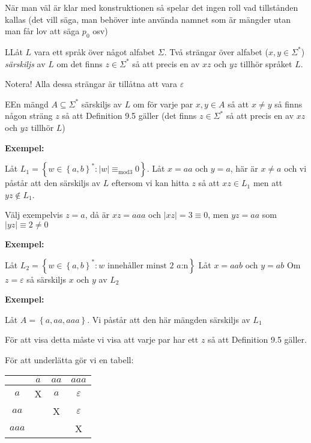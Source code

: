 \par\bigskip
\noindent När man väl är klar med konstruktionen så spelar det ingen roll vad tillstånden kallas (det vill säga, man behöver inte använda namnet som är mängder utan man får lov att säga $p_0$ osv)
\par\bigskip
\begin{theo}
  LLåt $L$ vara ett språk över något alfabet $\Sigma$. Två strängar över alfabet ($x,y\in\Sigma^*$) \textit{särskiljs} av $L$ om det finns $z\in\Sigma^*$ så att precis en av $xz$ och $yz$ tillhör språket $L$.
  \par\bigskip
  \noindent Notera! Alla dessa strängar är tillåtna att vara $\varepsilon$
\end{theo}
\par\bigskip
\begin{theo}
  EEn mängd $A\subseteq\Sigma^*$ särskiljs av $L$ om för varje par $x,y\in A$ så att $x\neq y$ så finns någon sträng $z$ så att Definition 9.5 gäller (det finns $z\in\Sigma^*$ så att precis en av $xz$ och $yz$ tillhör $L$)
\end{theo}
\par\bigskip
\noindent\textbf{Exempel:}\par
\noindent Låt $L_1 = \left\{w\in\left\{a,b\right\}^*:\left|w\right|\equiv_{\text{mod}3} 0\right\}$. Låt $x=aa$ och $y=a$, här är $x\neq a$ och vi påstår att den särskiljs av $L$ eftersom vi kan hitta $z$ så att $xz\in L_1$ men att $yz\notin L_1$.\par
\noindent Välj exempelvis $z=a$, då är $xz=aaa$ och $\left|xz\right|=3\equiv0$, men $yz=aa$ som $\left|yz\right|\equiv2\neq0$
\par\bigskip
\noindent\textbf{Exempel:}\par
\noindent Låt $L_2 = \left\{w\in\left\{a,b\right\}^*: w\text{ innehåller minst 2 } a\text{:n}\right\}$ Låt $x=aab$ och  $y=ab$
\noindent Om $z=\varepsilon$ så särskiljs $x$ och $y$ av $L_2$
\par\bigskip
\noindent\textbf{Exempel:}\par
\noindent Låt $A=\left\{a,aa,aaa\right\}$. Vi påstår att den här mängden särskiljs av $L_1$\par
\noindent För att visa detta måste vi visa att varje par har ett $z$ så att Definition 9.5 gäller.\par
\noindent För att underlätta gör vi en tabell:
\par\bigskip
\begin{center}
  \begin{tabular}{c|c|c|c}
    &$a$&$aa$&$aaa$\\
    \hline
    $a$&X&$a$&$\varepsilon$\\
    $aa$&&X&$\varepsilon$\\
    $aaa$&&&X
  \end{tabular}
\end{center}
